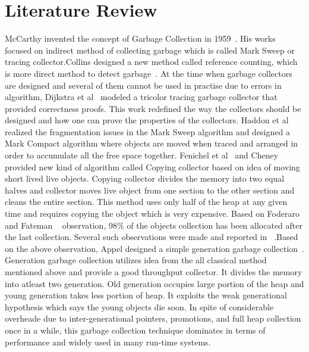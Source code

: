 \section{Literature Review}

McCarthy invented the concept of Garbage Collection in 1959~\cite{mccarthy}. His works focused on indirect method of collecting 
garbage which is called Mark Sweep or tracing collector.Collins designed a new method called reference counting, which is more direct method to detect garbage~\cite{Collins1960}. 
At the time when garbage collectors are designed and several of them cannot be used in practise due to errors in algorithm, Dijkstra et al~\cite{dijkstra} modeled a tricolor tracing garbage collector that provided correctness proofs. This work redefined the 
 way the collectors should be designed and how one can prove the properties of the collectors. Haddon et al ~\cite{haddon} realized 
 the fragmentation issues in the Mark Sweep algorithm and designed a Mark Compact algorithm where objects are moved when traced and arranged in order to accumulate all the free space together. Fenichel et al~\cite{feni} and Cheney~\cite{cheney}
 provided new kind of algorithm called Copying collector based on idea of moving short lived live objects. Copying collector divides the memory into two equal halves and collector moves live object from one section to the other section and cleans the entire section. This method uses only half of the heap at any given time and requires copying the object which is very expensive. Based on Foderaro and Fateman ~\cite{fode81} observation,  98\% of the objects collection has been allocated after the last collection. Several such observations were made and reported in ~\cite{zorn89,sans93}.Based on the above observation, Appel  designed a simple generation garbage collection~\cite{Appel89}. Generation garbage collection utilizes idea from the all classical method mentioned above and provide a good throughput collector. It divides the memory into atleast two generation. Old generation occupies large portion of the heap and young generation takes less portion of heap. It exploits the weak generational hypothesis which says the young objects die soon. In spite of considerable overheade due to inter-generational pointers, promotions, and full heap collection once in a while, this garbage collection technique dominates in terms of performance and widely used in many run-time systems.
 
